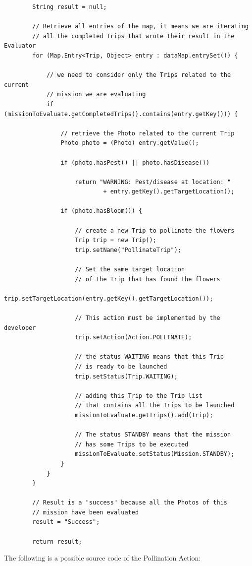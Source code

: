 \begin{lstlisting}
		String result = null;

		// Retrieve all entries of the map, it means we are iterating
        // all the completed Trips that wrote their result in the Evaluator
		for (Map.Entry<Trip, Object> entry : dataMap.entrySet()) {

			// we need to consider only the Trips related to the current
            // mission we are evaluating
			if (missionToEvaluate.getCompletedTrips().contains(entry.getKey())) {
				
				// retrieve the Photo related to the current Trip
				Photo photo = (Photo) entry.getValue();
				
				if (photo.hasPest() || photo.hasDisease())
					
					return "WARNING: Pest/disease at location: "
							+ entry.getKey().getTargetLocation();

				if (photo.hasBloom()) {

					// create a new Trip to pollinate the flowers
					Trip trip = new Trip();
					trip.setName("PollinateTrip");
                    
                    // Set the same target location
                    // of the Trip that has found the flowers
					trip.setTargetLocation(entry.getKey().getTargetLocation());
                    
                    // This action must be implemented by the developer
					trip.setAction(Action.POLLINATE);
                    
                    // the status WAITING means that this Trip
                    // is ready to be launched
					trip.setStatus(Trip.WAITING);

					// adding this Trip to the Trip list
                    // that contains all the Trips to be launched
					missionToEvaluate.getTrips().add(trip);
                    
					// The status STANDBY means that the mission
                    // has some Trips to be executed
					missionToEvaluate.setStatus(Mission.STANDBY);
				}
			}
		}

		// Result is a "success" because all the Photos of this 
        // mission have been evaluated
		result = "Success";
        
		return result;
\end{lstlisting}

The following is a possible source code of the Pollination Action:

